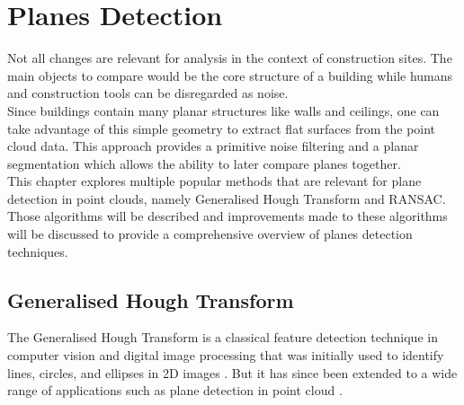 \chapter{Planes Detection}

Not all changes are relevant for analysis in the context of construction sites. The main objects to compare would be the core structure of a building while humans and construction tools can be disregarded as noise.\\

Since buildings contain many planar structures like walls and ceilings, one can take advantage of this simple geometry to extract flat surfaces from the point cloud data. This approach provides a primitive noise filtering and a planar segmentation which allows the ability to later compare planes together.\\

This chapter explores multiple popular methods that are relevant for plane detection in point clouds, namely Generalised Hough Transform and RANSAC. Those algorithms will be described and improvements made to these algorithms will be discussed to provide a comprehensive overview of planes detection techniques.

\section{Generalised Hough Transform}

The Generalised Hough Transform is a classical feature detection technique in computer vision and digital image processing that was initially used to identify lines, circles, and ellipses in 2D images \cite{hough1962}. But it has since been extended to a wide range of applications such as plane detection in point cloud \cite{hough3d}.\\


